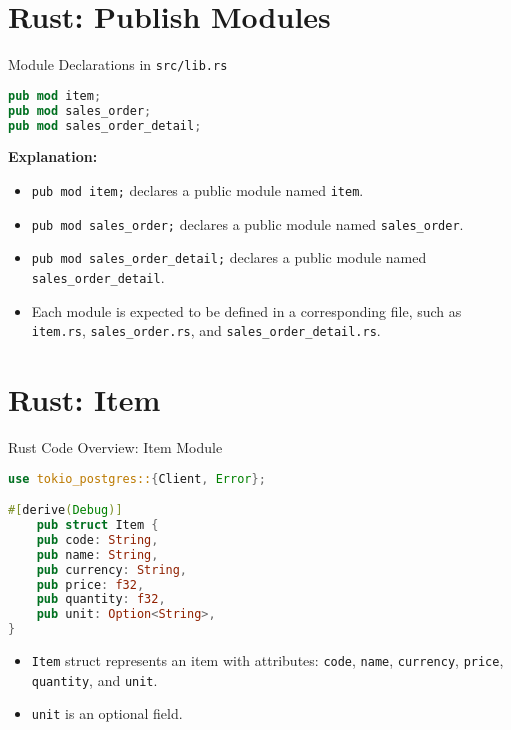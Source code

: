 \documentclass[aspectratio=169, table]{beamer}
\begin{document}
\section{Rust: Publish Modules}
\begin{frame}[fragile]{Module Declarations in \texttt{src/lib.rs}}
\begin{lstlisting}[language=Rust]
pub mod item;
pub mod sales_order;
pub mod sales_order_detail;
\end{lstlisting}

\textbf{Explanation:}
\begin{itemize}
\item \texttt{pub mod item;} declares a public module named \texttt{item}.
\item \texttt{pub mod sales\_order;} declares a public module named \texttt{sales\_order}.
\item \texttt{pub mod sales\_order\_detail;} declares a public module named \texttt{sales\_order\_detail}.
\item Each module is expected to be defined in a corresponding file, such as \texttt{item.rs}, \texttt{sales\_order.rs}, and \texttt{sales\_order\_detail.rs}.
\end{itemize}
\end{frame}


\section{Rust: Item}
\begin{frame}[fragile]{Rust Code Overview: Item Module}
\vspace{15pt}
\begin{lstlisting}[language=Rust]
use tokio_postgres::{Client, Error};

#[derive(Debug)]
	pub struct Item {
	pub code: String,
	pub name: String,
	pub currency: String,
	pub price: f32,
	pub quantity: f32,
	pub unit: Option<String>,
}
\end{lstlisting}

\begin{itemize}
\item \texttt{Item} struct represents an item with attributes: \texttt{code}, \texttt{name}, \texttt{currency}, \texttt{price}, \texttt{quantity}, and \texttt{unit}.
\item \texttt{unit} is an optional field.
\end{itemize}
\end{frame}
\end{document}
